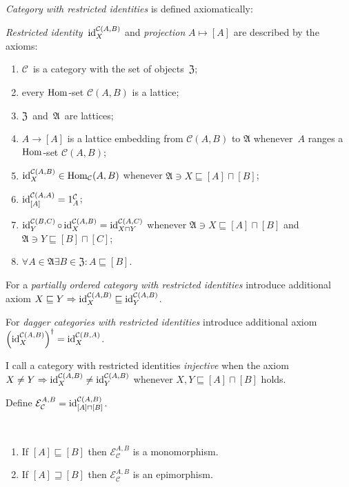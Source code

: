\begin{defn}
\label{unf-mor}
\emph{Category with restricted identities} is defined
axiomatically:

\emph{Restricted identity}~$\operatorname{id}^{\mathcal{C}(A,B)}_X$
and \emph{projection} $A\mapsto[A]$ are
described by the axioms:
\begin{enumerate}
\item $\mathcal{C}$~is a category with the set of
objects~$\mathfrak{Z}$;
\item every $\operatorname{Hom}$-set $\mathcal{C}(A,B)$ is a lattice;
\item $\mathfrak{Z}$~and~$\mathfrak{A}$~are lattices;
\item $A\to[A]$ is a lattice embedding
from $\mathcal{C}(A,B)$ to $\mathfrak{A}$ whenever~$A$
ranges a $\operatorname{Hom}$-set $\mathcal{C}(A,B)$;
\item $\operatorname{id}^{\mathcal{C}(A,B)}_X\in\operatorname{Hom}_{\mathcal{C}}(A,B)$
whenever $\mathfrak{A}\ni X\sqsubseteq [A]\sqcap[B]$;
\item $\operatorname{id}^{\mathcal{C}(A,A)}_{[A]} = 1^{\mathcal{C}}_A$;
\item $\operatorname{id}^{\mathcal{C}(B,C)}_Y \circ \operatorname{id}^{\mathcal{C}(A,B)}_X = \operatorname{id}^{\mathcal{C}(A,C)}_{X\sqcap Y}$
whenever $\mathfrak{A}\ni X\sqsubseteq [A]\sqcap[B]$
and $\mathfrak{A}\ni Y\sqsubseteq [B]\sqcap[C]$;
\item $\forall A\in\mathfrak{A}\exists B\in\mathfrak{Z}:
A\sqsubseteq[B]$.
\end{enumerate}

For a \emph{partially ordered category with restricted identities} introduce additional axiom $X\sqsubseteq Y\Rightarrow
\operatorname{id}^{\mathcal{C}(A,B)}_X\sqsubseteq\operatorname{id}^{\mathcal{C}(A,B)}_Y$.

For \emph{dagger categories with restricted identities} introduce additional axiom
$\left(\operatorname{id}^{\mathcal{C}(A,B)}_X\right)^\dagger =
\operatorname{id}^{\mathcal{C}(B,A)}_X$.
\end{defn}

\begin{defn}
I call a category with restricted identities
\emph{injective} when the axiom $X\ne Y\Rightarrow
\operatorname{id}^{\mathcal{C}(A,B)}_X\ne\operatorname{id}^{\mathcal{C}(A,B)}_Y$
whenever $X,Y\sqsubseteq[A]\sqcap[B]$ holds.
\end{defn}

\begin{defn}
Define $\mathcal{E}_{\mathcal{C}}^{A,B} =
\operatorname{id}^{\mathcal{C}(A,B)}_{[A]\sqcap[B]}$.
\end{defn}

\begin{prop}\label{e-mono-epi}
  ~  
  \begin{enumerate}
    \item If $[A]\sqsubseteq[B]$ then $\mathcal{E}_{\mathcal{C}}^{A,B}$ is a
    monomorphism.
    
    \item If $[A]\sqsupseteq[B]$ then $\mathcal{E}_{\mathcal{C}}^{A,B}$ is an
    epimorphism.
  \end{enumerate}
\end{prop}

